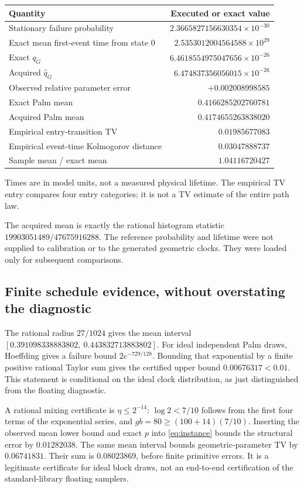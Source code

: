 \begin{center}
\begin{tabular}{lr}
\toprule
Quantity & Executed or exact value\\
\midrule
Stationary failure probability & $2.3665827156630354\times10^{-30}$\\
Exact mean first-event time from state $0$ & $2.5353012004564588\times10^{29}$\\
Exact $q_G$ & $6.4618554975047656\times10^{-26}$\\
Acquired $\widehat q_G$ & $6.474837356056015\times10^{-26}$\\
Observed relative parameter error & $+0.002008998585$\\
Exact Palm mean & $0.4166285202760781$\\
Acquired Palm mean & $0.4174655263838020$\\
Empirical entry-transition TV & $0.01985677083$\\
Empirical event-time Kolmogorov distance & $0.03047888737$\\
Sample mean / exact mean & $1.04116720427$\\
\bottomrule
\end{tabular}
\end{center}
Times are in model units, not a measured physical lifetime. The empirical TV
entry compares four entry categories; it is not a TV estimate of the entire
path law.

The acquired mean is exactly the rational histogram statistic
$19903051489/47675916288$. The reference probability and lifetime were not
supplied to calibration or to the generated geometric clocks. They were
loaded only for subsequent comparisons.

\subsection{Finite schedule evidence, without overstating the diagnostic}
The rational radius $27/1024$ gives the mean interval
$[0.391098338883802,\ 0.443832713883802]$.
For ideal independent Palm draws, Hoeffding gives a failure bound
$2e^{-729/128}$. Bounding that exponential by a finite positive rational
Taylor sum gives the certified upper bound $0.00676317<0.01$.
This statement is conditional on the ideal clock distribution, as just
distinguished from the floating diagnostic.

A rational mixing certificate is $\eta\le2^{-14}$: $\log 2<7/10$ follows
from the first four terms of the exponential series, and
$gb=80\ge(100+14)(7/10)$. Inserting the observed mean lower bound and exact
$p$ into \eqref{eq:instance} bounds the structural error by
$0.01282038$. The same mean interval bounds geometric-parameter TV by
$0.06741831$. Their sum is $0.08023869$, before finite primitive errors.
It is a legitimate certificate for ideal block draws, not an end-to-end
certification of the standard-library floating samplers.

